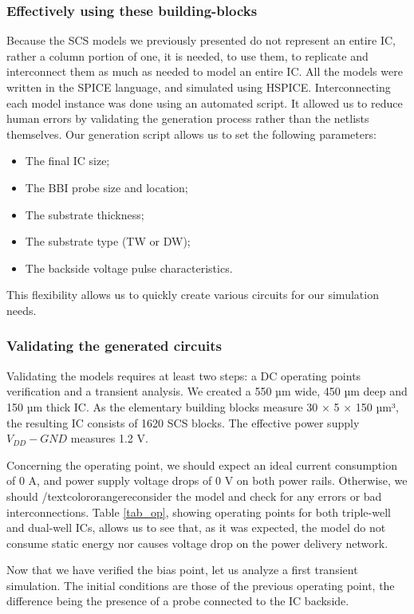 		\subsubsection{Effectively using these building-blocks}
		Because the SCS models we previously presented do not represent an entire IC, rather a column portion of one, it is needed, to use them, to replicate and interconnect them as much as needed to model an entire IC.
		All the models were written in the SPICE language, and simulated using HSPICE.
		Interconnecting each model instance was done using an automated script.
		It allowed us to reduce human errors by validating the generation process rather than the netlists themselves.
		Our generation script allows us to set the following parameters:
		\begin{itemize}
			\item The final IC size;
			\item The BBI probe size and location;
			\item The substrate thickness;
			\item The substrate type (TW or DW);
			\item The backside voltage pulse characteristics.
		\end{itemize}
		This flexibility allows us to quickly create various circuits for our simulation needs.
		
		\subsubsection{Validating the generated circuits}
		Validating the models requires at least two steps: a DC operating points verification and a transient analysis.
		We created a 550 µm wide, 450 µm deep and 150 µm thick IC.
		As the elementary building blocks measure 30 × 5 × 150 µm³, the resulting IC consists of 1620 SCS blocks.
		The effective power supply $V_{DD} - GND$ measures 1.2 V.
		
		Concerning the operating point, we should expect an ideal current consumption of 0 A, and power supply voltage drops of 0 V on both power rails.
		Otherwise, we should /textcolor{orange}{reconsider} the model and check for any errors or bad interconnections.
		Table \ref{tab_op}, showing operating points for both triple-well and dual-well ICs, allows us to see that, as it was expected, the model do not consume static energy nor causes voltage drop on the power delivery network.
		
		Now that we have verified the bias point, let us analyze a first transient simulation.
		The initial conditions are those of the previous operating point, the difference being the presence of a probe connected to the IC backside.
		
